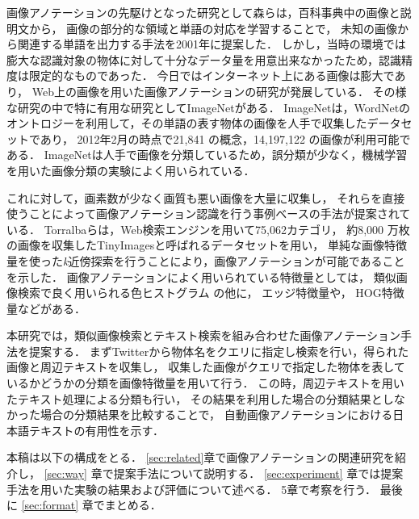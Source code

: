 画像アノテーションの先駆けとなった研究として森ら\cite{mori}は，百科事典中の画像と説明文から，
画像の部分的な領域と単語の対応を学習することで，
未知の画像から関連する単語を出力する手法を2001年に提案した．
しかし，当時の環境では膨大な認識対象の物体に対して十分なデータ量を用意出来なかったため，認識精度は限定的なものであった．
今日ではインターネット上にある画像は膨大であり，
Web上の画像を用いた画像アノテーションの研究が発展している．
その様な研究の中で特に有用な研究としてImageNet\cite{imagenet}がある．
ImageNet\cite{imagenet}は，WordNetのオントロジーを利用して，その単語の表す物体の画像を人手で収集したデータセットであり，
2012年2月の時点で21,841 の概念，14,197,122 の画像が利用可能である．
ImageNetは人手で画像を分類しているため，誤分類が少なく，機械学習を用いた画像分類の実験によく用いられている． 

これに対して，画素数が少なく画質も悪い画像を大量に収集し，
それらを直接使うことによって画像アノテーション認識を行う事例ベースの手法が提案されている．
Torralba\cite{torralba}らは，Web検索エンジンを用いて75,062カテゴリ，
約8,000 万枚の画像を収集したTinyImagesと呼ばれるデータセットを用い，
単純な画像特徴量を使った{\it k}近傍探索を行うことにより，画像アノテーションが可能であることを示した．
%
%
%
画像アノテーションによく用いられている特徴量としては，
類似画像検索で良く用いられる色ヒストグラム
の他に，
エッジ特徴量や，
HOG特徴量\cite{dalal}などがある．

本研究では，類似画像検索とテキスト検索を組み合わせた画像アノテーション手法を提案する．
まずTwitterから物体名をクエリに指定し検索を行い，得られた画像と周辺テキストを収集し，
収集した画像がクエリで指定した物体を表しているかどうかの分類を画像特徴量を用いて行う．
この時，周辺テキストを用いたテキスト処理による分類も行い，
その結果を利用した場合の分類結果としなかった場合の分類結果を比較することで，
自動画像アノテーションにおける日本語テキストの有用性を示す．


本稿は以下の構成をとる．
\ref{sec:related}章で画像アノテーションの関連研究を紹介し，
\ref{sec:way}
章で提案手法について説明する．
\ref{sec:experiment}
章では提案手法を用いた実験の結果および評価について述べる．
5章で考察を行う．
最後に
\ref{sec:format}
章でまとめる．

